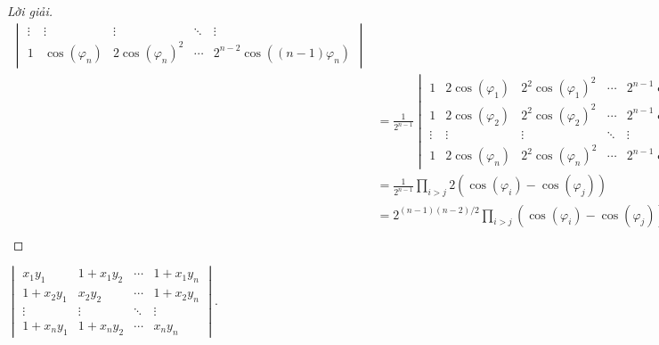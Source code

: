 \documentclass[class=linearalgebra,crop=false]{standalone}
\begin{document}
\begin{proof}[Lời giải]
\begin{align*}
\begin{vmatrix}
            \vdots & \vdots            & \vdots                 & \ddots & \vdots                        \\
            1      & \cos(\varphi_{n}) & 2\cos(\varphi_{n})^{2} & \cdots & 2^{n-2}\cos((n-1)\varphi_{n})
        \end{vmatrix}       \\
         & = \frac{1}{2^{n-1}}
        \begin{vmatrix}
            1      & 2\cos(\varphi_{1}) & 2^{2}\cos(\varphi_{1})^{2} & \cdots & 2^{n-1}\cos(\varphi_{1})^{n-1} \\
            1      & 2\cos(\varphi_{2}) & 2^{2}\cos(\varphi_{2})^{2} & \cdots & 2^{n-1}\cos(\varphi_{2})^{n-2} \\
            \vdots & \vdots             & \vdots                     & \ddots & \vdots                         \\
            1      & 2\cos(\varphi_{n}) & 2^{2}\cos(\varphi_{n})^{2} & \cdots & 2^{n-1}\cos(\varphi_{n})^{n-1}
        \end{vmatrix} \\
         & = \frac{1}{2^{n-1}}\prod_{i>j}2(\cos(\varphi_{i}) - \cos(\varphi_{j}))                          \\
         & = 2^{(n-1)(n-2)/2}\prod_{i>j}(\cos(\varphi_{i}) - \cos(\varphi_{j})).                           \\
    \end{align*}
    \endgroup
\end{proof}

\begin{exercise}
    $\begin{vmatrix}
            x_{1}y_{1}     & 1 + x_{1}y_{2} & \cdots & 1 + x_{1}y_{n} \\
            1 + x_{2}y_{1} & x_{2}y_{2}     & \cdots & 1 + x_{2}y_{n} \\
            \vdots         & \vdots         & \ddots & \vdots         \\
            1 + x_{n}y_{1} & 1 + x_{n}y_{2} & \cdots & x_{n}y_{n}
        \end{vmatrix}$.
\end{exercise}
\end{document}
